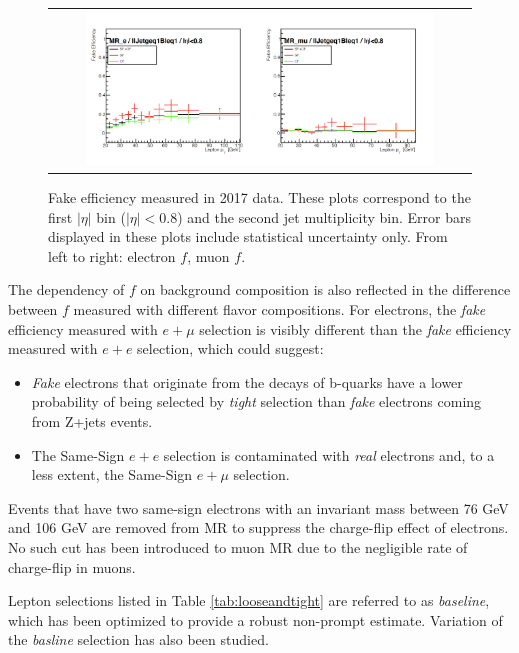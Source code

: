 \begin{figure}[tbh!]
 \begin{center}
 \begin{tabular}{c}
 \includegraphics[width=0.85\textwidth]{figures/Part3/Nonprompt/MR/fake_eff}
 \end{tabular}
 \caption{Fake efficiency measured in 2017 data. These plots correspond to the first $|\eta|$ bin ($|\eta|<$0.8) and the second jet multiplicity bin. Error bars displayed in these plots include statistical uncertainty only. From left to right: electron $f$, muon $f$.}
 \label{fig:fake_eff}
 \end{center}
\end{figure}

The dependency of $f$ on background composition is also reflected in the difference between $f$ measured with different flavor compositions. For electrons, the \emph{fake} efficiency measured with $e+\mu$ selection is visibly different than the \emph{fake} efficiency measured with $e+e$ selection, which could suggest:

\begin{itemize}
\item \emph{Fake} electrons that originate from the decays of b-quarks have a lower probability of being selected by \emph{tight} selection than \emph{fake} electrons coming from Z+jets events.
\item The Same-Sign $e+e$ selection is contaminated with \emph{real} electrons and, to a less extent, the Same-Sign $e+\mu$ selection.
\end{itemize}

Events that have two same-sign electrons with an invariant mass between 76 GeV and 106 GeV are removed from MR to suppress the charge-flip effect of electrons. No such cut has been introduced to muon MR due to the negligible rate of charge-flip in muons.

Lepton selections listed in Table \ref{tab:looseandtight} are referred to as \emph{baseline}, which has been optimized to provide a robust non-prompt estimate. Variation of the \emph{basline} selection has also been studied. 

